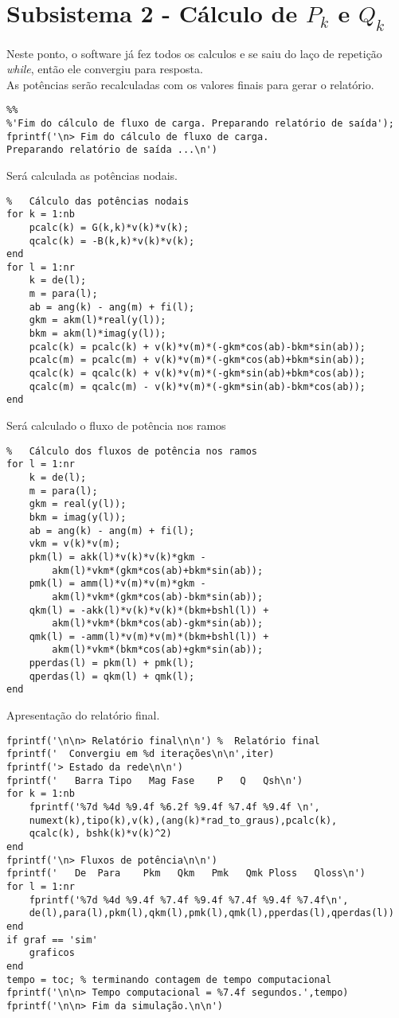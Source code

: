 \section{Subsistema 2 - Cálculo de $P_k$ e $Q_k$}
Neste ponto, o software já fez todos os calculos e se saiu do laço de repetição \textit{while}, então ele convergiu para resposta.\\
As potências serão recalculadas com os valores finais para gerar o relatório.
\begin{verbatim}
%%
%'Fim do cálculo de fluxo de carga. Preparando relatório de saída');
fprintf('\n> Fim do cálculo de fluxo de carga. 
Preparando relatório de saída ...\n')
\end{verbatim}
Será calculada as potências nodais.
\begin{verbatim}
%	Cálculo das potências nodais
for k = 1:nb
	pcalc(k) = G(k,k)*v(k)*v(k);
    qcalc(k) = -B(k,k)*v(k)*v(k);
end
for l = 1:nr
	k = de(l);
    m = para(l);
    ab = ang(k) - ang(m) + fi(l);
    gkm = akm(l)*real(y(l));
    bkm = akm(l)*imag(y(l));
    pcalc(k) = pcalc(k) + v(k)*v(m)*(-gkm*cos(ab)-bkm*sin(ab));
    pcalc(m) = pcalc(m) + v(k)*v(m)*(-gkm*cos(ab)+bkm*sin(ab));
    qcalc(k) = qcalc(k) + v(k)*v(m)*(-gkm*sin(ab)+bkm*cos(ab));
    qcalc(m) = qcalc(m) - v(k)*v(m)*(-gkm*sin(ab)-bkm*cos(ab));
end
\end{verbatim}
Será calculado o fluxo de potência nos ramos
\begin{verbatim}
%	Cálculo dos fluxos de potência nos ramos
for l = 1:nr
    k = de(l);
    m = para(l);
    gkm = real(y(l));
    bkm = imag(y(l));
    ab = ang(k) - ang(m) + fi(l);
    vkm = v(k)*v(m);
    pkm(l) = akk(l)*v(k)*v(k)*gkm -
        akm(l)*vkm*(gkm*cos(ab)+bkm*sin(ab));
    pmk(l) = amm(l)*v(m)*v(m)*gkm -
        akm(l)*vkm*(gkm*cos(ab)-bkm*sin(ab));
    qkm(l) = -akk(l)*v(k)*v(k)*(bkm+bshl(l)) +
        akm(l)*vkm*(bkm*cos(ab)-gkm*sin(ab));
    qmk(l) = -amm(l)*v(m)*v(m)*(bkm+bshl(l)) +
        akm(l)*vkm*(bkm*cos(ab)+gkm*sin(ab));
    pperdas(l) = pkm(l) + pmk(l);
    qperdas(l) = qkm(l) + qmk(l);
end
\end{verbatim}
Apresentação do relatório final. 
\begin{verbatim}
fprintf('\n\n> Relatório final\n\n') %	Relatório final
fprintf('  Convergiu em %d iterações\n\n',iter)
fprintf('> Estado da rede\n\n')
fprintf('   Barra Tipo   Mag Fase    P   Q   Qsh\n')
for k = 1:nb
    fprintf('%7d %4d %9.4f %6.2f %9.4f %7.4f %9.4f \n',
    numext(k),tipo(k),v(k),(ang(k)*rad_to_graus),pcalc(k),
    qcalc(k), bshk(k)*v(k)^2)
end
fprintf('\n> Fluxos de potência\n\n')
fprintf('   De  Para    Pkm   Qkm   Pmk   Qmk Ploss   Qloss\n')
for l = 1:nr
    fprintf('%7d %4d %9.4f %7.4f %9.4f %7.4f %9.4f %7.4f\n',
    de(l),para(l),pkm(l),qkm(l),pmk(l),qmk(l),pperdas(l),qperdas(l))
end
if graf == 'sim'
    graficos
end
tempo = toc; % terminando contagem de tempo computacional
fprintf('\n\n> Tempo computacional = %7.4f segundos.',tempo)
fprintf('\n\n> Fim da simulação.\n\n')
\end{verbatim}
